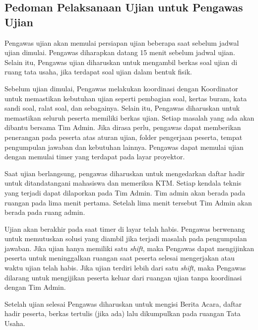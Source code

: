 \subsection{Pedoman Pelaksanaan Ujian untuk Pengawas Ujian}
    Pengawas ujian akan memulai persiapan ujian beberapa saat sebelum jadwal ujian
    dimulai. Pengawas diharapkan datang 15 menit sebelum jadwal ujian. Selain
    itu, Pengawas ujian diharuskan untuk mengambil berkas soal ujian di ruang
    tata usaha, jika terdapat soal ujian dalam bentuk fisik.

    Sebelum ujian dimulai, Pengawas melakukan koordinasi dengan Koordinator
    untuk memastikan kebutuhan ujian seperti pembagian soal, kertas buram, kata
    sandi soal, ralat soal, dan sebagainya. Selain itu, Pengawas diharuskan
    untuk memastikan seluruh peserta memiliki berkas ujian. Setiap masalah yang
    ada akan dibantu bersama Tim Admin. Jika dirasa perlu, pengawas dapat
    memberikan penerangan pada peserta atas aturan ujian, folder pengerjaan
    peserta, tempat pengumpulan jawaban dan kebutuhan lainnya. Pengawas dapat
    memulai ujian dengan memulai timer yang terdapat pada layar proyektor.

    Saat ujian berlangsung, pengawas diharuskan untuk mengedarkan daftar hadir
    untuk ditandatangani mahasiswa dan memeriksa KTM. Setiap kendala teknis yang
    terjadi dapat dilaporkan pada Tim Admin. Tim admin akan berada pada ruangan
    pada lima menit pertama. Setelah lima menit tersebut Tim Admin akan berada
    pada ruang admin. 
    
    Ujian akan berakhir pada saat timer di layar telah habis. Pengawas berwenang
    untuk memutuskan solusi yang diambil jika terjadi masalah pada pengumpulan
    jawaban. Jika ujian hanya memiliki satu \textit{shift}, maka Pengawas dapat
    mengijinkan peserta untuk meninggalkan ruangan saat peserta selesai
    mengerjakan atau waktu ujian telah habis. Jika ujian terdiri lebih dari satu
    \textit{shift}, maka Pengawas dilarang untuk mengijikan peserta keluar dari
    ruangan ujian tanpa koordinasi dengan Tim Admin.

    Setelah ujian selesai Pengawas diharuskan untuk mengisi Berita Acara, daftar
    hadir peserta, berkas tertulis (jika ada) lalu dikumpulkan pada ruangan Tata
    Usaha.
    
